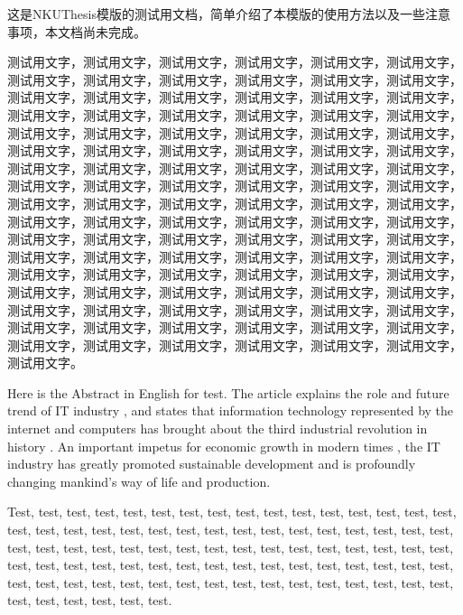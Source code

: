 
\begin{chnabstract}
这是NKUThesis模版的测试用文档，简单介绍了本模版的使用方法以及一些注意事项，本文档尚未完成。

测试用文字，测试用文字，测试用文字，测试用文字，测试用文字，测试用文字，测试用文字，测试用文字，测试用文字，测试用文字，测试用文字，测试用文字，测试用文字，测试用文字，测试用文字，测试用文字，测试用文字，测试用文字，测试用文字，测试用文字，测试用文字，测试用文字，测试用文字，测试用文字，测试用文字，测试用文字，测试用文字，测试用文字，测试用文字，测试用文字，测试用文字，测试用文字，测试用文字，测试用文字，测试用文字，测试用文字，测试用文字，测试用文字，测试用文字，测试用文字，测试用文字，测试用文字，测试用文字，测试用文字，测试用文字，测试用文字，测试用文字，测试用文字，测试用文字，测试用文字，测试用文字，测试用文字，测试用文字，测试用文字，测试用文字，测试用文字，测试用文字，测试用文字，测试用文字，测试用文字，测试用文字，测试用文字，测试用文字，测试用文字，测试用文字，测试用文字，测试用文字，测试用文字，测试用文字，测试用文字，测试用文字，测试用文字，测试用文字，测试用文字，测试用文字，测试用文字，测试用文字，测试用文字，测试用文字，测试用文字，测试用文字，测试用文字，测试用文字，测试用文字，测试用文字，测试用文字，测试用文字，测试用文字，测试用文字，测试用文字，测试用文字，测试用文字，测试用文字，测试用文字，测试用文字，测试用文字，测试用文字，测试用文字，测试用文字，测试用文字，测试用文字，测试用文字，测试用文字。
\end{chnabstract}

\begin{engabstract}
Here is the Abstract in English for test. The article explains the role and future trend of IT industry , and states that information technology represented by the internet and computers has brought about the third industrial revolution in history . An important impetus for economic growth in modern times , the IT industry has greatly promoted sustainable development and is profoundly changing mankind's way of life and production.

Test, test, test, test, test, test, test, test, test, test, test, test, test, test, test, test, test, test, test, test, test, test, test, test, test, test, test, test, test, test, test, test, test, test, test, test, test, test, test, test, test, test, test, test, test, test, test, test, test, test, test, test, test, test, test, test, test, test, test, test, test, test, test, test, test, test, test, test, test, test, test, test, test, test, test, test, test, test, test, test, test, test, test, test, test, test.
\end{engabstract}
